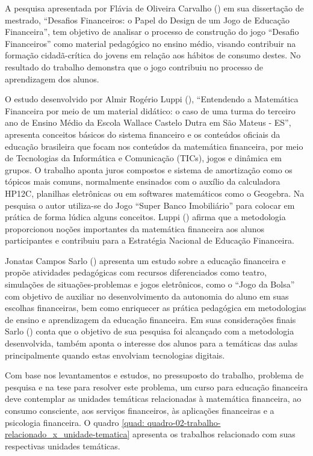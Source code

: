 A pesquisa apresentada por Flávia de Oliveira Carvalho (\citeyear{flavia2016}) em sua dissertação de mestrado, “Desafios Financeiros: o Papel do Design de um Jogo de Educação Financeira”, tem objetivo de analisar o processo de construção do jogo “Desafio Financeiros” como material pedagógico no ensino médio, visando contribuir na formação cidadã-crítica do jovens em relação aos hábitos de consumo destes. No resultado do trabalho demonstra que o jogo contribuiu no processo de aprendizagem dos alunos.

\newpage

O estudo desenvolvido por Almir Rogério Luppi (\citeyear{luppi2018}), “Entendendo a Matemática Financeira por meio de um material didático: o caso de uma turma do terceiro ano de Ensino Médio da Escola Wallace Castelo Dutra em São Mateus - ES”, apresenta conceitos básicos do sistema financeiro e os conteúdos oficiais da educação brasileira que focam nos conteúdos da matemática financeira, por meio de Tecnologias da Informática e Comunicação (TICs), jogos e dinâmica em grupos. O trabalho aponta juros compostos e sistema de amortização como os tópicos mais comuns, normalmente ensinados com o auxílio da calculadora HP12C, planilhas eletrônicas ou em softwares matemáticos como o Geogebra. Na pesquisa o autor utiliza-se do Jogo “Super Banco Imobiliário” para colocar em prática de forma lúdica alguns conceitos. Luppi (\citeyear{luppi2018}) afirma que a metodologia proporcionou noções importantes da matemática financeira aos alunos participantes e contribuiu para a Estratégia Nacional de Educação Financeira.

Jonatas Campos Sarlo (\citeyear{sarlo2019}) apresenta um estudo sobre a educação financeira e propõe atividades pedagógicas com recursos diferenciados como teatro, simulações de situações-problemas e jogos eletrônicos, como o “Jogo da Bolsa” com objetivo de auxiliar no desenvolvimento da autonomia do aluno em suas escolhas financeiras, bem como enriquecer as prática pedagógica em metodologias de ensino e aprendizagem da educação financeira. Em suas considerações finais Sarlo (\citeyear{sarlo2019}) conta que o objetivo de sua pesquisa foi alcançado com a metodologia desenvolvida, também aponta o interesse dos alunos para a temáticas das aulas principalmente quando estas envolviam tecnologias digitais.

Com base nos levantamentos e estudos, no pressuposto do trabalho, problema de pesquisa e na tese para resolver este problema, um curso para educação financeira deve contemplar as unidades temáticas relacionadas à matemática financeira, ao consumo consciente, aos serviços financeiros, às aplicações financeiras e a psicologia financeira. O quadro \ref{quad: quadro-02-trabalho-relacionado_x_unidade-tematica} apresenta os trabalhos relacionado com suas respectivas unidades temáticas.

